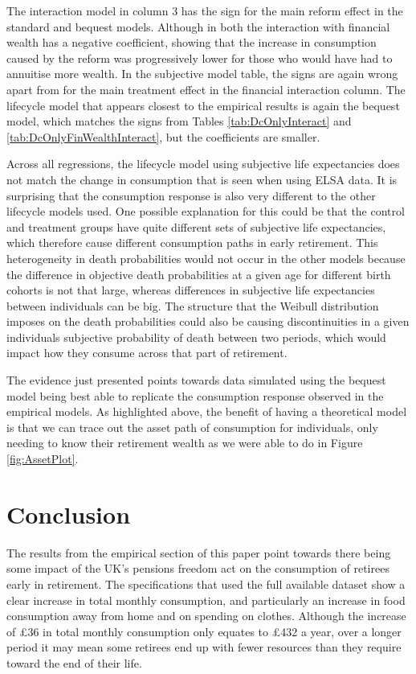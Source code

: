 \documentclass[12pt]{article}
\begin{document}
The interaction model in column 3 has the sign for the main
reform effect in the standard and bequest models. Although in both the
interaction with financial wealth has a negative coefficient, showing that the
increase in consumption caused by the reform was progressively lower for those
who would have had to annuitise more wealth. In the subjective model table, the
signs are again wrong apart from for the main treatment effect in the financial
interaction column. The lifecycle model that appears closest to the empirical
results is again the bequest model, which matches the signs from Tables
\ref{tab:DcOnlyInteract} and \ref{tab:DcOnlyFinWealthInteract}, but the
coefficients are smaller.

Across all regressions, the lifecycle model using subjective life expectancies
does not match the change in consumption that is seen when using ELSA data. It
is surprising that the consumption response is also very different to the other
lifecycle models used. One possible explanation for this could be that the
control and treatment groups have quite different sets of subjective life
expectancies, which therefore cause different consumption paths in early
retirement. This heterogeneity in death probabilities would not occur in the
other models because the difference in objective death probabilities at a given
age for different birth cohorts is not that large, whereas differences in
subjective life expectancies between individuals can be big. The structure that
the Weibull distribution imposes on the death probabilities could also be
causing discontinuities in a given individuals subjective probability of death
between two periods, which would impact how they consume across that part of
retirement.

The evidence just presented points towards data simulated using the bequest
model being best able to replicate the consumption response observed in the
empirical models. As highlighted above, the benefit of having a theoretical
model is that we can trace out the asset path of consumption for individuals,
only needing to know their retirement wealth as we were able to do in
Figure \ref{fig:AssetPlot}.

\section{Conclusion}

The results from the empirical section of this paper point towards there being
some impact of the UK's pensions freedom act on the consumption of retirees
early in retirement. The specifications that used the full available dataset
show a clear increase in total monthly consumption, and particularly an increase
in food consumption away from home and on spending on clothes. Although the
increase of £36 in total monthly consumption only equates to £432 a year, over
a longer period it may mean some retirees end up with fewer resources than they
require toward the end of their life.
\end{document}
